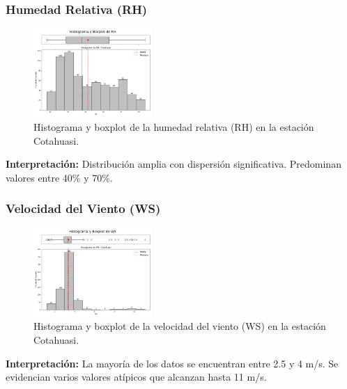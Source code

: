 \subsubsection*{Humedad Relativa (RH)}
\begin{figure}[H]
\centering
\includegraphics[width=0.4\textwidth]{resultados/por_estacion_meteorologica/Cotahuasi/RH_histograma.png}
\caption{Histograma y boxplot de la humedad relativa (RH) en la estación Cotahuasi.}
\label{fig:cotahuasi_RH}
\end{figure}
\textbf{Interpretación:} Distribución amplia con dispersión significativa. Predominan valores entre 40\% y 70\%.

\subsubsection*{Velocidad del Viento (WS)}
\begin{figure}[H]
\centering
\includegraphics[width=0.4\textwidth]{resultados/por_estacion_meteorologica/Cotahuasi/WS_histograma.png}
\caption{Histograma y boxplot de la velocidad del viento (WS) en la estación Cotahuasi.}
\label{fig:cotahuasi_WS}
\end{figure}
\textbf{Interpretación:} La mayoría de los datos se encuentran entre 2.5 y 4 m/s. Se evidencian varios valores atípicos que alcanzan hasta 11 m/s.

